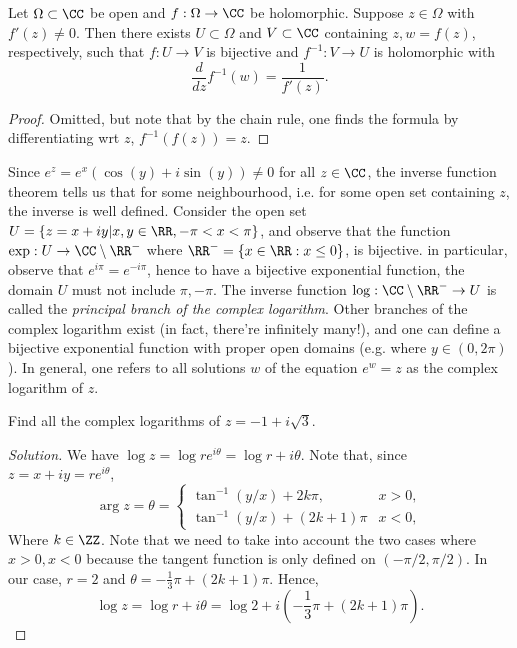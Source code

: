 \begin{theorem}
  Let $\Omega\subset\CC$ be open and $f:\Omega\to\CC$ be holomorphic. Suppose
  $z\in\Omega$ with $f'(z)\neq 0$. Then there exists $U\subset\Omega$ and
  $V\subset\CC$ containing $z, w=f(z)$, respectively, such that $f:U\to V$ is
  bijective and $f^{-1}:V\to U$ is holomorphic with 
  \[\frac{d}{dz}f^{-1}(w) =\frac{1}{f'(z)}.\]
  \label{thm:inverseFunction}
\end{theorem}
\begin{proof}
  Omitted, but note that by the chain rule, one finds the formula by
  differentiating wrt $z$, $f^{-1}(f(z))=z$.
\end{proof}
Since $e^{z}=e^x(\cos(y)+ i\sin(y)) \neq 0$ for all $z\in\CC$, the inverse
function theorem tells us that for some neighbourhood, i.e. for some open set
containing $z$, the inverse is well defined. Consider the open set
$U=\{z=x+iy|x,y\in\RR, -\pi<x<\pi\}$, and observe that the function
$\exp:U\to\CC\setminus\RR^-$ where $\RR^-=\{x\in\RR : x\leq 0\}$, is bijective.
in particular, observe that $e^{i\pi}=e^{-i\pi}$, hence to have a bijective
exponential function, the domain $U$ must not include $\pi,-\pi$. The inverse
function $\log:\CC\setminus\RR^-\to U$ is called the \emph{principal branch of
the complex logarithm}. Other branches of the complex logarithm exist (in fact,
there're infinitely many!), and one can define a bijective exponential function
with proper open domains (e.g. where $y\in (0,2\pi)$). In general, one refers to
all solutions $w$ of the equation $e^w=z$ as the complex logarithm of $z$.
\begin{example}
  Find all the complex logarithms of $z=-1+i\sqrt{3}$.
\end{example}
\begin{proof}[Solution]
  We have $\log z=\log re^{i\theta} = \log r + i\theta$. Note that, since
  $z=x+iy=re^{i\theta}$,
  \[\arg z=\theta = 
    \begin{cases}
      \tan^{-1}(y/x)+2k\pi, & x>0,\\
      \tan^{-1}(y/x) + (2k+1)\pi & x<0,
    \end{cases}
  \]
  Where $k\in \ZZ$. Note that we need to take into account the two cases where
  $x>0,x<0$ because the tangent function is only defined on $(-\pi/2,\pi/2)$. In
  our case, $r=2$ and $\theta=-\frac{1}{3}\pi + (2k+1)\pi$.  Hence,
  \[\log z = \log r + i\theta = \log 2 + i(-\frac{1}{3}\pi + (2k+1)\pi).\]
\end{proof}

